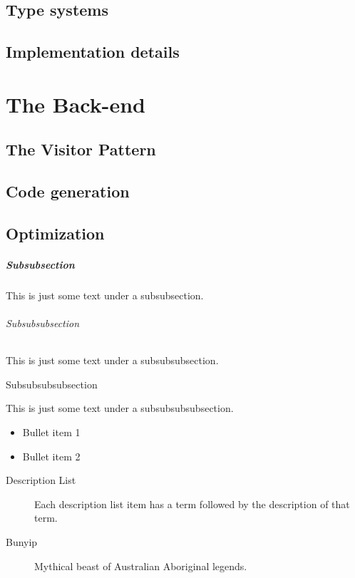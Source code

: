 \documentclass[letterpaper,12pt,openany,reqno]{book}%
\begin{document}
\chapter {Type systems}
\chapter {Implementation details}

\part{The Back-end}
\chapter {The Visitor Pattern}
\chapter {Code generation}
\chapter {Optimization}

\subsubsection{Subsubsection}

This is just some text under a subsubsection.

\paragraph{Subsubsubsection}

This is just some  text under a subsubsubsection.

\subparagraph{Subsubsubsubsection}

This is just some text under a subsubsubsubsection.


\begin{itemize}
\item Bullet item 1

\item Bullet item 2

\end{itemize}

\begin{description}
\item[Description List] Each description list item has a term followed by the
description of that term.

\item[Bunyip] Mythical beast of Australian Aboriginal legends.
\end{description}
\end{document}
